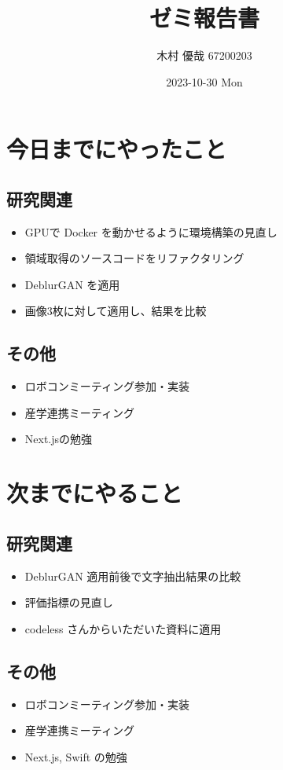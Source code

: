 \documentclass[uplatex, onecolumn, 10pt]{jsarticle}
\begin{document}
\title{\vspace{-40mm}\bf{\LARGE{ゼミ報告書}}}
\author{\vspace{-40mm}木村 優哉 67200203}
\date{2023-10-30 Mon}
\maketitle


\section{今日までにやったこと}

\subsection*{研究関連}
\begin{itemize}
	\item GPUで Docker を動かせるように環境構築の見直し
	\item 領域取得のソースコードをリファクタリング
	\item DeblurGAN を適用
	\item 画像3枚に対して適用し、結果を比較
\end{itemize}

\subsection*{その他}
\begin{itemize}
	\item ロボコンミーティング参加・実装
	\item 産学連携ミーティング
	\item Next.jsの勉強
\end{itemize}


\section{次までにやること}

\subsection*{研究関連}
\begin{itemize}
	\item DeblurGAN 適用前後で文字抽出結果の比較
	\item 評価指標の見直し
	\item codeless さんからいただいた資料に適用
\end{itemize}

\subsection*{その他}
\begin{itemize}
	\item ロボコンミーティング参加・実装
	\item 産学連携ミーティング
	\item Next.js, Swift の勉強
\end{itemize}
\end{document}
